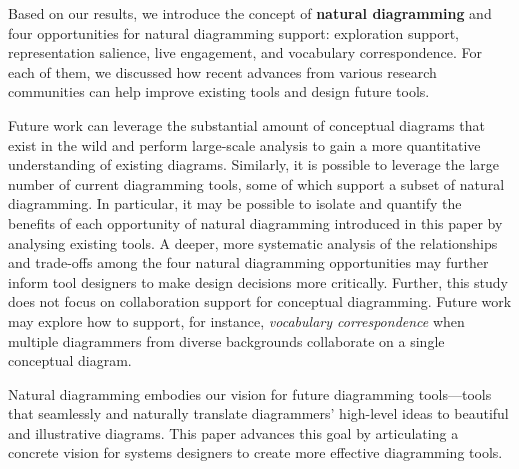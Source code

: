 Based on our results, we introduce the concept of \textbf{natural diagramming} and four opportunities for natural diagramming support: exploration support, representation salience, live engagement, and vocabulary correspondence. For each of them, we discussed how recent advances from various research communities can help improve existing tools and design future tools.

Future work can leverage the substantial amount of conceptual diagrams that exist in the wild and perform large-scale analysis to gain a more quantitative understanding of existing diagrams. Similarly, it is possible to leverage the large number of current diagramming tools, some of which support a subset of natural diagramming. In particular, it may be possible to isolate and quantify the benefits of each opportunity of natural diagramming introduced in this paper by analysing existing tools. A deeper, more systematic analysis of the relationships and trade-offs among the four natural diagramming opportunities may further inform tool designers to make design decisions more critically. Further, this study does not focus on collaboration support for conceptual diagramming. Future work may explore how to support, for instance, \textit{vocabulary correspondence} when multiple diagrammers from diverse backgrounds collaborate on a single conceptual diagram. 

Natural diagramming embodies our vision for future diagramming tools---tools that seamlessly and naturally translate diagrammers' high-level ideas to beautiful and illustrative diagrams. This paper advances this goal by articulating a concrete vision for systems designers to create more effective diagramming tools.

